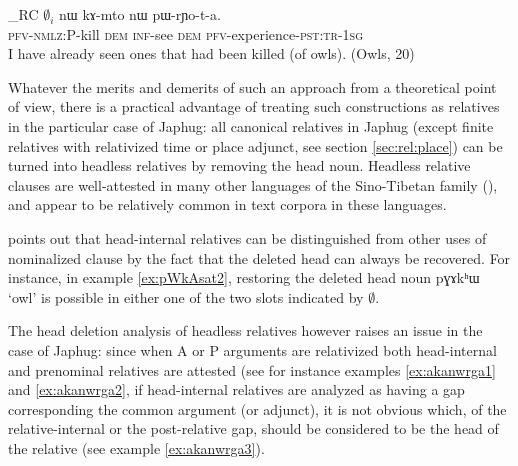 \documentclass[oldfontcommands,oneside,a4paper,11pt]{article}
\newcommand{\ipa}[1]{{\phon #1}} %
\newcommand{\topic}{\textsc{dem}}
\begin{document}
   \begin{exe}
\ex \label{ex:pWkAsat2}
\gll [$\emptyset_i$ \ipa{pɯ-kɤ-sat}]_{RC}  $\emptyset_i$ 	\ipa{nɯ}  	\ipa{kɤ-mto}  	\ipa{nɯ}  	\ipa{pɯ-rɲo-t-a.}  \\
{ }  \textsc{pfv-nmlz:P}-kill { } \topic{} \textsc{inf}-see \topic{} \textsc{pfv}-experience-\textsc{pst:tr-1sg} \\
\glt I have already seen ones that had been killed (of owls). (Owls, 20)
  \end{exe}

Whatever the merits and demerits of such an approach from a theoretical point of view, there is a practical advantage of treating such constructions as relatives in the particular case of Japhug: all canonical relatives in Japhug (except  finite relatives with relativized time or place adjunct, see section \ref{sec:rel:place}) can be turned into headless relatives by removing the head noun. Headless relative clauses are well-attested in many other languages of the Sino-Tibetan family (\citealt[128-9]{genetti08nmlz}), and appear to be relatively common in text corpora in these languages.

\citet[227]{coupe07mongsen} points out that head-internal relatives can be distinguished from other uses of nominalized clause by the fact that the deleted head can always be recovered. For instance, in example \ref{ex:pWkAsat2}, restoring the deleted head noun \ipa{pɣɤkʰɯ} `owl' is possible in either one of the two slots indicated by $\emptyset$.

The head deletion analysis of headless relatives however raises an issue in the case of Japhug: since when A or P arguments are relativized both head-internal and prenominal relatives are attested (see for instance examples \ref{ex:akanwrga1} and \ref{ex:akanwrga2}, if head-internal relatives are analyzed as having a gap corresponding the common argument (or adjunct), it is not obvious which, of the relative-internal or the post-relative gap, should be considered to be the head of the relative (see example \ref{ex:akanwrga3}).
\end{document}
